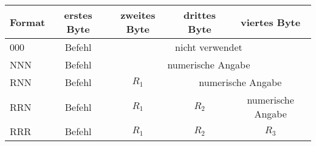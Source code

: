 \begin{center}
  \begin{tabular}{|l||*{4}{c|}}
    \hline
    Format & erstes Byte & zweites Byte  & drittes Byte  & viertes Byte
    \\\hline\hline
    000 & Befehl & \multicolumn{3}{c|}{nicht verwendet}             \\\hline
    NNN & Befehl & \multicolumn{3}{c|}{numerische Angabe}           \\\hline
    RNN & Befehl & $R_{1}$ & \multicolumn{2}{c|}{numerische Angabe} \\\hline
    RRN & Befehl & $R_{1}$ & $R_{2}$ & numerische Angabe            \\\hline
    RRR & Befehl & $R_{1}$ & $R_{2}$ & $R_{3}$                      \\\hline
  \end{tabular}
\end{center}



